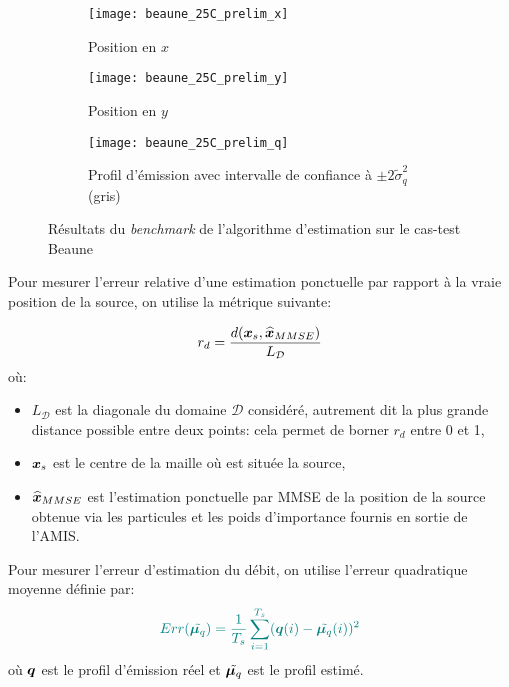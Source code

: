  \begin{figure}[h!]
 	\centering
 	\begin{subfigure}[t]{0.5\textwidth}
 		\centering
 		\texttt{[image: beaune\_25C\_prelim\_x]}
 		\caption{Position en $x$}
 		\label{fig_25C_prelim_X}
 	\end{subfigure}%
 	\begin{subfigure}[t]{0.5\textwidth}
 		\centering
 		\texttt{[image: beaune\_25C\_prelim\_y]}
 		\caption{Position en $y$}
 		\label{fig_25C_prelim_Y}
 	\end{subfigure}
 	\begin{subfigure}[t]{0.65\textwidth}
 		\centering
 		\texttt{[image: beaune\_25C\_prelim\_q]}
 		\caption{Profil d'émission avec intervalle de confiance à  $\pm 2 \widetilde{\sigma}_q^2$ (gris)}
 		\label{fig_25C_prelim_Q}
 	\end{subfigure} 
 	\caption{Résultats du \textit{benchmark} de l'algorithme d'estimation sur le cas-test Beaune}
 	\label{fig_25C_prelim}
 \end{figure}
 
 Pour mesurer l'erreur relative d'une estimation ponctuelle par rapport à la vraie position de la source, on utilise la métrique suivante:
 
 \begin{equation}
	 r_d = \dfrac{d({\bm{x}}_s,\widehat{{\bm{x}}}_{MMSE})}{L_{\mathcal{D}}}
 \end{equation}
 où:
 \begin{itemize}
 	\item $L_{\mathcal{D}}$ est la diagonale du domaine $\mathcal{D}$ considéré, autrement dit la plus grande distance possible entre deux points: cela permet de borner $r_d$ entre 0 et 1,
 	\item ${\bm{x}}_s$ est le centre de la maille où est située la source,
 	\item $\widehat{{\bm{x}}} _{MMSE}$ est l'estimation ponctuelle par MMSE de la position de la source obtenue via les particules et les poids d'importance fournis en sortie de l'AMIS.
 \end{itemize}
 
 Pour mesurer l'erreur d'estimation du débit, on utilise l'erreur quadratique moyenne définie par:
 \begin{equation}
 \NdFS{
	 Err(\tilde{\VecMeanQ}) = \dfrac{1}{T_s} \sum\limits_{i=1}^{T_s}(\VecQSource(i) - \tilde{\VecMeanQ}(i))^2
	}
 \end{equation}
 où ${\bm{q}}$ est le profil d'émission réel et $\tilde{{\bm{\mu}_q}}$ est le profil estimé.\\
 
